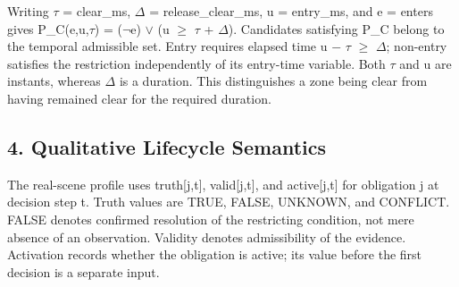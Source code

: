 \documentclass[11pt,a4paper]{article}
\begin{document}
Writing {\ttfamily\small \ensuremath{\tau} = clear\_ms}, {\ttfamily\small \ensuremath{\Delta} = release\_clear\_ms}, {\ttfamily\small u = entry\_ms}, and {\ttfamily\small e = enters} gives {\ttfamily\small P\_C(e,u,\ensuremath{\tau}) = (\ensuremath{\neg}e) \ensuremath{\lor} (u \ensuremath{\geq} \ensuremath{\tau} + \ensuremath{\Delta})}. Candidates satisfying P\_C belong to the temporal admissible set. Entry requires elapsed time {\ttfamily\small u \ensuremath{-} \ensuremath{\tau} \ensuremath{\geq} \ensuremath{\Delta}}; non-entry satisfies the restriction independently of its entry-time variable. Both \ensuremath{\tau} and u are instants, whereas \ensuremath{\Delta} is a duration. This distinguishes a zone being clear from having remained clear for the required duration.\par

\subsection*{4. Qualitative Lifecycle Semantics}

The real-scene profile uses {\ttfamily\small truth[j,t]}, {\ttfamily\small valid[j,t]}, and {\ttfamily\small active[j,t]} for obligation j at decision step t. Truth values are TRUE, FALSE, UNKNOWN, and CONFLICT. FALSE denotes confirmed resolution of the restricting condition, not mere absence of an observation. Validity denotes admissibility of the evidence. Activation records whether the obligation is active; its value before the first decision is a separate input.\par
\end{document}
